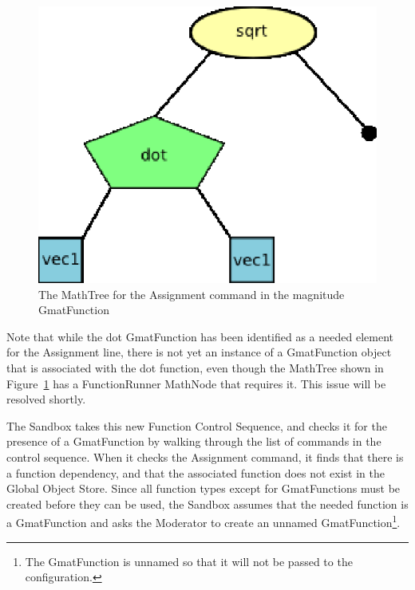 \begin{figure}[htb]
\begin{center}
\includegraphics[scale=0.5]{Images/DotMathTreeExample.eps}
\caption{\label{figure:DotFunMathTree}The MathTree for the Assignment command in the magnitude
GmatFunction}
\end{center}
\end{figure}

Note that while the dot GmatFunction has been identified as a needed element for the Assignment
line, there is not yet an instance of a GmatFunction object that is associated with the dot
function, even though the MathTree shown in Figure~\ref{figure:DotFunMathTree} has a FunctionRunner
MathNode that requires it.  This issue will be resolved shortly.

The Sandbox takes this new Function Control Sequence, and checks it for the presence of a
GmatFunction by walking through the list of commands in the control sequence.  When it checks the
Assignment command, it finds that there is a function dependency, and that the associated function
does not exist in the Global Object Store.  Since all function types except for GmatFunctions must
be created before they can be used, the Sandbox assumes that the needed function is a GmatFunction
and asks the Moderator to create an unnamed GmatFunction\footnote{The GmatFunction is unnamed so
that it will not be passed to the configuration.}.

